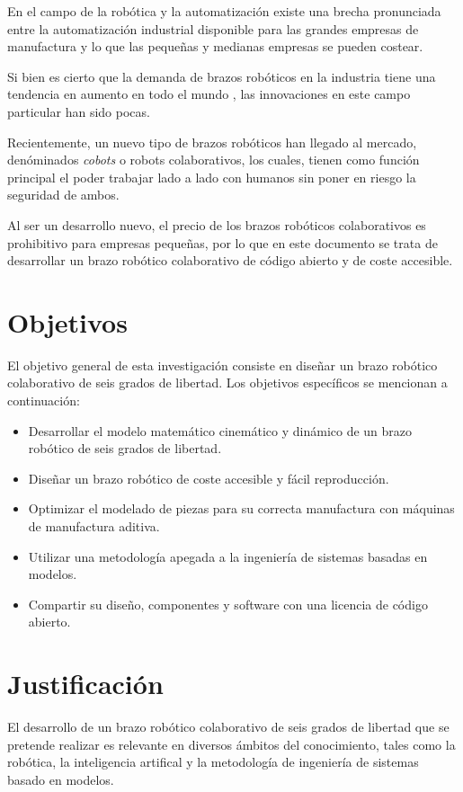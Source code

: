 En el campo de la robótica y la automatización existe una brecha pronunciada entre la automatización industrial disponible para las grandes empresas de manufactura y lo que las pequeñas y medianas empresas se pueden costear.  

Si bien es cierto que la demanda de brazos robóticos en la industria tiene una tendencia en aumento en todo el mundo \cite{summary2019}, las innovaciones en este campo particular han sido pocas.

Recientemente, un nuevo tipo de brazos robóticos han llegado al mercado, denóminados \textit{cobots} o robots colaborativos, los cuales, tienen como función principal el poder trabajar lado a lado con humanos sin poner en riesgo la seguridad de ambos.

Al ser un desarrollo nuevo, el precio de los brazos robóticos colaborativos es prohibitivo para empresas pequeñas, por lo que en este documento se trata de desarrollar un brazo robótico colaborativo de código abierto y de coste accesible.


\section{Objetivos}

El objetivo general de esta investigación consiste en diseñar un brazo robótico colaborativo de seis grados de libertad. Los objetivos específicos se mencionan a continuación:

\begin{itemize}
\itemsep0em 
\item Desarrollar el modelo matemático cinemático y dinámico de un brazo robótico de seis grados de libertad.
\item Diseñar un brazo robótico de coste accesible y fácil reproducción.
\item Optimizar el modelado de piezas para su correcta manufactura con máquinas de manufactura aditiva.
\item Utilizar una metodología apegada a la ingeniería de sistemas basadas en modelos.
\item Compartir su diseño, componentes y software con una licencia de código abierto. 
\end{itemize}

\section{Justificación}

El desarrollo de un brazo robótico colaborativo de seis grados de libertad que se pretende realizar es relevante en diversos ámbitos del conocimiento, tales como la robótica, la inteligencia artifical y la metodología de ingeniería de sistemas basado en modelos.

